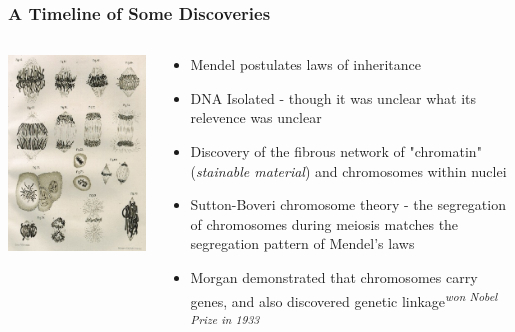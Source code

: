 \documentclass{beamer}
\begin{document}
		\begin{frame}
			\frametitle{A Timeline of Some Discoveries}
			
			\begin{columns}
				\begin{column}{0.4\textwidth}
					\includegraphics[keepaspectratio, width  =\textwidth]{img/chromosomes}
				\end{column}
				\begin{column}{0.6\textwidth}
					\begin{itemize}
						\small
						\item[1865]  Mendel postulates laws of inheritance 
						\item[1869]  DNA Isolated - though it was unclear what its relevence was unclear 
						\item[1882] Discovery of the fibrous network of "chromatin" (\textit{stainable material}) and chromosomes within nuclei 
						\item[1902-6]  Sutton-Boveri chromosome theory - the segregation of chromosomes during meiosis matches the segregation pattern of Mendel’s laws 
						\item[1915] Morgan demonstrated that chromosomes carry genes, and also discovered genetic linkage\textsuperscript{\textit{won Nobel Prize in 1933}}
						

\end{itemize}
\end{column}
\end{columns}
\end{frame}
\end{document}
